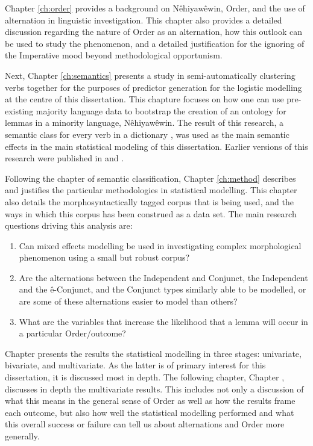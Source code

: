 Chapter \ref{ch:order} provides a background on Nêhiyawêwin, Order, and the use of alternation in linguistic investigation. This chapter also provides a detailed discussion regarding the nature of Order as an alternation, how this outlook can be used to study the phenomenon, and a detailed justification for the ignoring of the Imperative mood beyond methodological opportunism. 

Next, Chapter \ref{ch:semantics} presents a study in semi-automatically clustering verbs together for the purposes of predictor generation for the logistic modelling at the centre of this dissertation. This chapture focuses on how one can use pre-existing majority language data to bootstrap the creation of an ontology for lemmas in a minority language, Nêhiyawêwin. The result of this research, a semantic class for every verb in a dictionary \citep{Wolvengrey2001}, was used as the main semantic effects in the main statistical modeling of this dissertation. Earlier versions of this research were published in \cite{harrigan-arppe-2021-leveraging} and \cite{harriganPACsem}.

Following the chapter of semantic classification, Chapter \ref{ch:method} describes and justifies the particular methodologies in statistical modelling. This chapter also details the morphosyntactically tagged corpus that is being used, and the ways in which this corpus has been construed as a data set. The main research questions driving this analysis are: 

\begin{enumerate}
    \item Can mixed effects modelling be used in investigating complex morphological phenomenon using a small but robust corpus?
    \item Are the alternations between the Independent and Conjunct, the Independent and the ê-Conjunct, and the Conjunct types similarly able to be modelled, or are some of these alternations easier to model than others?
    \item What are the variables that increase the likelihood that a lemma will occur in a particular Order/outcome?
\end{enumerate}

Chapter \label{ch:result} presents the results the statistical modelling in three stages: univariate, bivariate, and multivariate. As the latter is of primary interest for this dissertation, it is discussed most in depth. The following chapter, Chapter \label{ch:disscussion}, discusses in depth the multivariate results. This includes not only a discussion of what this means in the general sense of Order as well as how the results frame each outcome, but also how well the statistical modelling performed and what this overall success or failure can tell us about alternations and Order more generally.